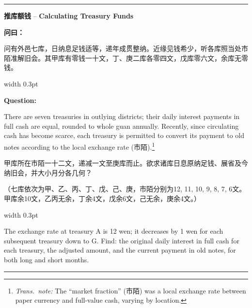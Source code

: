 \documentclass[10pt,a4paper]{article}
\newcommand{\cnlabel}[1]{\textcolor{labelcolor}{\textbf{#1}}}
\newcommand{\enlabel}[1]{\textcolor{labelcolor}{\textbf{#1}}}
\newcommand{\transnote}[1]{\footnote{\textit{Trans.\ note:} #1}}
\newenvironment{problemsection}{%
  \medskip\par\noindent\textcolor{rulecolor}{\rule{\textwidth}{0.4pt}}\par\smallskip%
}{\par\smallskip\noindent\textcolor{rulecolor}{\rule{\textwidth}{0.4pt}}\par\medskip}
\begin{document}
\begin{problemsection}

\noindent\begin{minipage}[t]{\textwidth}
\begin{center}
\textbf{推库额钱} -- \textbf{Calculating Treasury Funds}
\end{center}
\end{minipage}

\vspace{0.3em}

\noindent\begin{minipage}[t]{0.47\textwidth}
\begin{flushleft}
\small
\cnlabel{问曰：}

问有外邑七库，日纳息足钱适等，递年成贯整纳。近缘见钱希少，听各库照当处市陌准解旧会。其甲库有零钱一十文，丁、庚二库各零四文，戊库零六文，余库无零钱。
\end{flushleft}
\end{minipage}%
\hfill\vrule width 0.3pt\hfill%
\begin{minipage}[t]{0.47\textwidth}
\begin{flushleft}
\small
\enlabel{Question:}

There are seven treasuries in outlying districts; their daily interest payments in full cash are equal, rounded to whole guan annually. Recently, since circulating cash has become scarce, each treasury is permitted to convert its payment to old notes according to the local exchange rate (市陌).\transnote{The ``market fraction'' (市陌) was a local exchange rate between paper currency and full-value cash, varying by location.}
\end{flushleft}
\end{minipage}

\vspace{0.3em}

\noindent\begin{minipage}[t]{0.47\textwidth}
\begin{flushleft}
\small
甲库所在市陌一十二文，递减一文至庚库而止。欲求诸库日息原纳足钱、展省及今纳旧会，并大小月分各几何？

（七库依次为甲、乙、丙、丁、戊、己、庚，市陌分别为12, 11, 10, 9, 8, 7, 6文。甲库余10文，乙丙无余，丁余4文，戊余6文，己无余，庚余4文。）
\end{flushleft}
\end{minipage}%
\hfill\vrule width 0.3pt\hfill%
\begin{minipage}[t]{0.47\textwidth}
\begin{flushleft}
\small
The exchange rate at treasury A is 12 wen; it decreases by 1 wen for each subsequent treasury down to G. Find: the original daily interest in full cash for each treasury, the adjusted amount, and the current payment in old notes, for both long and short months.


\end{flushleft}
\end{minipage}
\end{problemsection}
\end{document}
